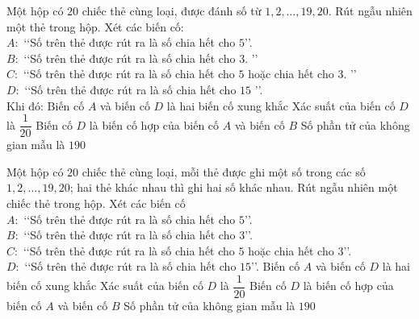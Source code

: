 \begin{ex}%
  Một hộp có $20$ chiếc thẻ cùng loại, được đánh số từ $1,2,\ldots,19,20$. Rút ngẫu nhiên một thẻ trong hộp. Xét các biến cố:\\
 $A:$ \lq\lq Số trên thẻ được rút ra là số chia  hết cho $5$\rq\rq.\\
 $B:$ \lq\lq Số trên thẻ  được rút ra là số chia hết cho $3$. \rq\rq\\
 $C:$ \lq\lq Số trên thẻ được rút ra là số chia hết cho $5$ hoặc chia hết cho $3$. \rq\rq\\ 
 $D:$ \lq\lq Số trên  thẻ được rút ra là số chia hết cho $15$ \rq\rq. \\
 Khi  đó:
  \choiceTF
  {Biến cố $A$ và  biến cố $D$ là hai biến cố xung khắc}
  {\True  Xác suất của biến cố $D$ là $\dfrac{1}{20}$}
  {Biến cố $D$ là biến cố hợp của biến cố $A$  và biến cố $B$}
  {Số phần tử của không gian mẫu là $190$} 
\end{ex}

\begin{ex}%
 Một hộp có $20$ chiếc thẻ cùng loại, mỗi thẻ được ghi một  số trong các số {$1,2,\ldots,19,20$}; hai thẻ khác nhau thì ghi hai số khác nhau. Rút ngẫu nhiên một chiếc thẻ trong hộp. Xét các biến cố\\
 \indent $A\colon$ \lq\lq Số  trên thẻ được rút ra là số chia hết cho $5$\rq\rq.\\
 \indent $B\colon$ \lq\lq Số trên thẻ được rút ra là số chia hết  cho $3$\rq\rq.\\
 \indent $C\colon$ \lq\lq Số trên thẻ được rút ra là số chia hết  cho $5$ hoặc chia hết cho $3$\rq\rq.\\
 \indent $D\colon$ \lq\lq Số trên thẻ được rút ra là  số chia hết cho $15$\rq\rq.
  \choiceTF
  {Biến cố $A$ và biến cố $D$ là hai  biến cố xung khắc}
   {\True Xác suất của biến cố $D$ là $\dfrac{1}{20}$}
  {Biến cố $D$ là biến cố hợp của biến cố $A$ và biến  cố $B$}
  {Số phần  tử của không gian mẫu là $190$}
\end{ex}

